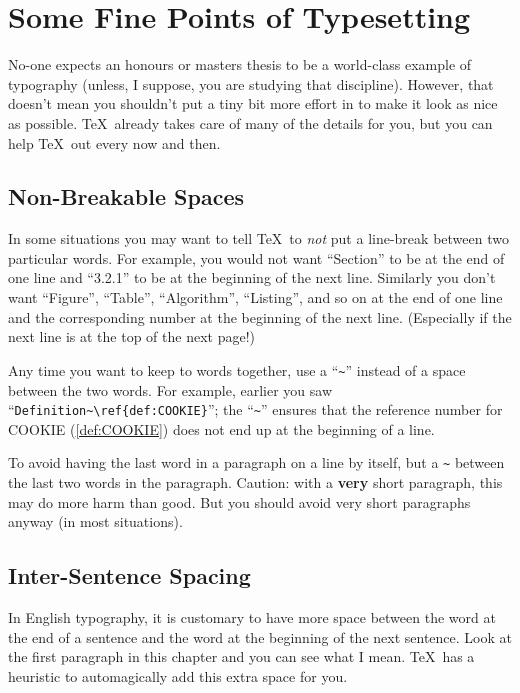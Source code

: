 

\chapter{Some Fine Points of Typesetting}

No-one expects an honours or masters thesis to be a world-class
example of typography (unless, I suppose, you are studying that
discipline).
However, that doesn't mean you shouldn't put a tiny bit more effort in
to make it look as nice as possible.  \TeX\ already takes care of many
of the details for you, but you can help \TeX\ out every now and then.

\section{Non-Breakable Spaces}

In some situations you may want to tell \TeX\ to \emph{not} put a
line-break between two particular words.  For example, you would not
want ``Section'' to be at the end of one line and ``3.2.1'' to be at
the beginning of the next line.  Similarly you don't want ``Figure'',
``Table'', ``Algorithm'', ``Listing'', and so on at the end of one
line and the corresponding number at the beginning of the next line.
(Especially if the next line is at the top of the next page!)

Any time you want to keep to words together, use a ``\verb|~|''
instead of a space between the two words.  For example, earlier you
saw ``\verb|Definition~\ref{def:COOKIE}|''; the ``\verb|~|'' ensures
that the reference number for COOKIE (\ref{def:COOKIE}) does not end
up at the beginning of a line.

To avoid having the last word in a paragraph on a line by itself, but
a \verb|~| between the last two words in the paragraph.  Caution: with
a \textbf{very} short paragraph, this may do more harm than good.  But
you should avoid very short paragraphs anyway (in most situations).

\need 1in

\section{Inter-Sentence Spacing}

In English typography, it is customary to have more space between the
word at the end of a sentence and the word at the beginning of the
next sentence.  Look at the first paragraph in this chapter and you can see
what I mean.   \TeX\ has a heuristic to automagically add this extra space
for you.

